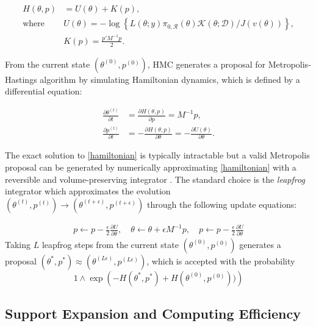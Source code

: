 \documentclass[10pt]{article}
\newcommand{\mc}[1]{\mathcal{#1}}
\DeclareMathOperator{\1}{\mathbbm{1}}
\newcommand{\dt}{\epsilon} %
\newcommand{\mass}{M} %
\begin{document}
\begin{equation}
\begin{aligned}
H(\theta, p)& = U(\theta)+K(p),\\
\text{where } & U(\theta) = -\log\left\{ L(\theta;y)\pi_{0,\mc R}(\theta) \mc{K}(\theta;\mc D) / J(v(\theta)) \right\},\\
& K(p) = \frac{p'\mass^{-1} p}{2}.
\end{aligned}
\end{equation}

From the current state $(\theta^{(0)},p^{(0)})$, HMC generates a proposal for Metropolis-Hastings algorithm by simulating Hamiltonian dynamics, which is defined by a differential equation:

\begin{equation}
\begin{aligned}
\label{hamiltonian}
\frac{\partial \theta ^{(t)}}{\partial t} & =\frac{\partial H(\theta, p)}{\partial p} = \mass^{-1}p,\\
\frac{\partial p^{(t)}}{\partial t}& =-\frac{\partial H(\theta, p)}{\partial \theta} = -\frac{\partial U(\theta)}{\partial \theta}.
\end{aligned}
\end{equation}

The exact solution to \eqref{hamiltonian} is typically intractable but a valid Metropolis proposal can be generated by numerically approximating \eqref{hamiltonian} with a reversible and volume-preserving  integrator \citep{neal2011mcmc}. The standard choice is the \textit{leapfrog} integrator which approximates the evolution $(\theta^{(t)},p^{(t)}) \to (\theta^{(t + \dt)},p^{(t + \dt)})$ through the following update equations:

\begin{equation}
\begin{aligned}
\label{leap-frog}
p \leftarrow p - \frac{\dt}{2} \frac{\partial U}{\partial  \theta },\quad
\theta \leftarrow  \theta  + \dt \mass^{-1}p,\quad
p \leftarrow p -  \frac{\dt}{2}  \frac{\partial U}{\partial  \theta } 
\end{aligned}
\end{equation}
Taking $L$ leapfrog steps from the current state $(\theta^{(0)},p^{(0)})$ generates a proposal $(\theta^{*},p^{*}) \approx (\theta^{(L \dt)},p^{(L \dt)})$, which is accepted with the probability 
$$1\wedge \exp  \left( - H(\theta^{*},p^{*}) + H(\theta^{(0)},p^{(0)}))\right)$$


\subsection{Support Expansion and Computing Efficiency}
\end{document}
